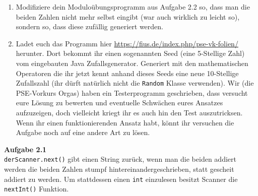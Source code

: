 \documentclass{../../sheet}
\begin{document}
\begin{enumerate}
    \item Modifiziere dein Moduloübungsprogramm aus Aufgabe 2.2 so, dass man die beiden Zahlen nicht mehr selbst eingibt (war auch wirklich zu leicht so), sondern so, dass diese zufällig generiert werden.
    \item Ladet euch das Programm hier \url{https://fius.de/index.php/pse-vk-folien/} herunter. Dort bekommt ihr einen sogenannten Seed (eine 5-Stellige Zahl) vom eingebauten Java Zufallsgenerator. Generiert mit den mathematischen Operatoren die ihr jetzt kennt anhand dieses Seeds eine neue 10-Stellige Zufallszahl (ihr dürft natürlich nicht die \texttt{Random} Klasse verwenden). Wir (die PSE-Vorkurs Orgas) haben ein Testerprogramm geschrieben, dass versucht eure Lösung zu bewerten und eventuelle Schwächen eures Ansatzes aufzuzeigen, doch vielleicht kriegt ihr es auch hin den Test auszutricksen. Wenn ihr einen funktionierenden Ansatz habt, könnt ihr versuchen die Aufgabe noch auf eine andere Art zu lösen.   
\end{enumerate}

\newpage
{}
\hypertarget{Aufgabe_2.1}{}
\textbf{Aufgabe 2.1}\\
\texttt{derScanner.next()} gibt einen String zurück, wenn man die beiden addiert werden die beiden Zahlen stumpf hintereinandergeschrieben, statt gescheit addiert zu werden. Um stattdessen einen \texttt{int} einzulesen besitzt Scanner die \texttt{nextInt()} Funktion.
\end{document}
